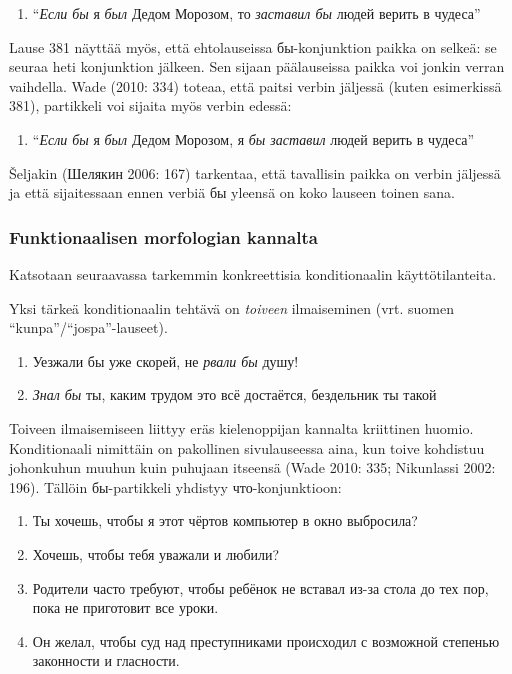 \documentclass[]{scrartcl}
\providecommand{\tightlist}{%
  \setlength{\itemsep}{0pt}\setlength{\parskip}{0pt}}
\begin{document}
\begin{enumerate}
\def\labelenumi{(\arabic{enumi})}
\setcounter{enumi}{380}
\tightlist
\item
  ``\emph{Если бы} я \emph{был} Дедом Морозом, то \emph{заставил бы}
  людей верить в чудеса''
\end{enumerate}

Lause 381 näyttää myös, että ehtolauseissa бы-konjunktion paikka on
selkeä: se seuraa heti konjunktion jälkeen. Sen sijaan päälauseissa
paikka voi jonkin verran vaihdella. Wade (2010: 334) toteaa, että paitsi
verbin jäljessä (kuten esimerkissä 381), partikkeli voi sijaita myös
verbin edessä:

\begin{enumerate}
\def\labelenumi{(\arabic{enumi})}
\setcounter{enumi}{381}
\tightlist
\item
  ``\emph{Если бы} я \emph{был} Дедом Морозом, я \emph{бы заставил}
  людей верить в чудеса''
\end{enumerate}

Šeljakin (Шелякин 2006: 167) tarkentaa, että tavallisin paikka on verbin
jäljessä ja että sijaitessaan ennen verbiä бы yleensä on koko lauseen
toinen sana.

\subsubsection{Funktionaalisen morfologian
kannalta}\label{funktionaalisen-morfologian-kannalta}

Katsotaan seuraavassa tarkemmin konkreettisia konditionaalin
käyttötilanteita.

Yksi tärkeä konditionaalin tehtävä on \emph{toiveen} ilmaiseminen (vrt.
suomen ``kunpa''/``jospa''-lauseet).

\begin{enumerate}
\def\labelenumi{(\arabic{enumi})}
\setcounter{enumi}{382}
\tightlist
\item
  Уезжали бы уже скорей, не \emph{рвали бы} душу!
\item
  \emph{Знал бы} ты, каким трудом это всё достаётся, бездельник ты такой
\end{enumerate}

Toiveen ilmaisemiseen liittyy eräs kielenoppijan kannalta kriittinen
huomio. Konditionaali nimittäin on pakollinen sivulauseessa aina, kun
toive kohdistuu johonkuhun muuhun kuin puhujaan itseensä (Wade 2010:
335; Nikunlassi 2002: 196). Tällöin бы-partikkeli yhdistyy
что-konjunktioon:

\begin{enumerate}
\def\labelenumi{(\arabic{enumi})}
\setcounter{enumi}{384}
\tightlist
\item
  Ты хочешь, чтобы я этот чёртов компьютер в окно выбросила?
\item
  Хочешь, чтобы тебя уважали и любили?
\item
  Родители часто требуют, чтобы ребёнок не вставал из-за стола до тех
  пор, пока не приготовит все уроки.
\item
  Он желал, чтобы суд над преступниками происходил с возможной степенью
  законности и гласности.
\end{enumerate}
\end{document}

